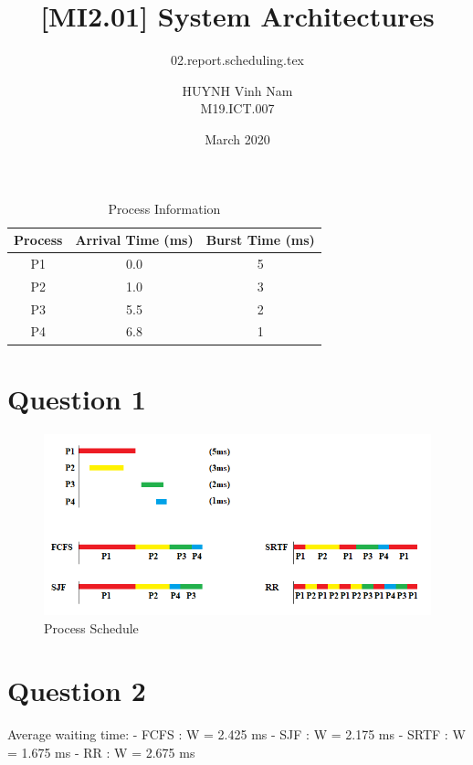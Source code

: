 \documentclass[10pt, a4paper]{article}
\title{[MI2.01] System Architectures}
\subtitle{02.report.scheduling.tex}
\author{HUYNH Vinh Nam \\ M19.ICT.007}
\date{March 2020}
\begin{document}
\maketitle


\begin{table}[H]
\caption{Process Information}
\begin{center}
\begin{tabular}{|c|c|c|}
\hline
    Process & Arrival Time (ms) & Burst Time (ms) \\
\hline
    P1 & 0.0 & 5 \\
\hline
    P2 & 1.0 & 3 \\
\hline
    P3 & 5.5 & 2 \\
\hline
    P4 & 6.8 & 1 \\
\hline
\end{tabular}
\end{center}
\end{table}

\section{Question 1}

\begin{figure}[H]
\includegraphics[width=\textwidth]{Sched.png}
\caption{Process Schedule}
\end{figure}

\section{Question 2}

\begin{verbbox}
Average waiting time: 
- FCFS	: W = 2.425 ms 
- SJF	: W = 2.175 ms 
- SRTF	: W = 1.675 ms 
- RR	: W = 2.675 ms 
\end{verbbox}
\end{document}

